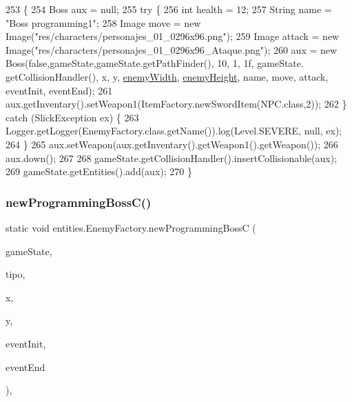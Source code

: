 \begin{DoxyCode}
253                                                                                                            
                                          \{
254         Boss aux = null;
255         \textcolor{keywordflow}{try} \{
256             \textcolor{keywordtype}{int} health = 12;
257             String name = \textcolor{stringliteral}{"Boss programming1"};
258             Image move = \textcolor{keyword}{new} Image(\textcolor{stringliteral}{"res/characters/personajes\_01\_0296x96.png"});
259             Image attack = \textcolor{keyword}{new} Image(\textcolor{stringliteral}{"res/characters/personajes\_01\_0296x96\_Ataque.png"});
260             aux = \textcolor{keyword}{new} Boss(\textcolor{keyword}{false},gameState,gameState.getPathFinder(), 10, 1, 1f, gameState.
      getCollisionHandler(), x, y, \mbox{\hyperlink{classentities_1_1_enemy_factory_a3396d252fc506310c58e3a32494bbe36}{enemyWidth}}, \mbox{\hyperlink{classentities_1_1_enemy_factory_aa4632fbf138ccc9cc222e7437ccd8284}{enemyHeight}}, name, move, attack, eventInit, eventEnd);
261             aux.getInventary().setWeapon1(ItemFactory.newSwordItem(NPC.class,2));
262         \} \textcolor{keywordflow}{catch} (SlickException ex) \{
263             Logger.getLogger(EnemyFactory.class.getName()).log(Level.SEVERE, null, ex);
264         \}
265         aux.setWeapon(aux.getInventary().getWeapon1().getWeapon());
266         aux.down();
267 
268         gameState.getCollisionHandler().insertCollisionable(aux);
269         gameState.getEntities().add(aux);
270     \}
\end{DoxyCode}
\mbox{\label{classentities_1_1_enemy_factory_a7c242d1d38ea0c7aa084b837ec7a77e5}} 
\subsubsection{\texorpdfstring{new\+Programming\+Boss\+C()}{newProgrammingBossC()}}
{\footnotesize\ttfamily static void entities.\+Enemy\+Factory.\+new\+Programming\+BossC (\begin{DoxyParamCaption}\item[{final \mbox{\hyperlink{classstates_1_1_game_state}{Game\+State}}}]{game\+State,  }\item[{int}]{tipo,  }\item[{int}]{x,  }\item[{int}]{y,  }\item[{\mbox{\hyperlink{interfaceentities_1_1_event_launcher}{Event\+Launcher}}}]{event\+Init,  }\item[{\mbox{\hyperlink{interfaceentities_1_1_event_launcher}{Event\+Launcher}}}]{event\+End }\end{DoxyParamCaption})\hspace{0.3cm}{\ttfamily [inline]}, {\ttfamily [static]}}


